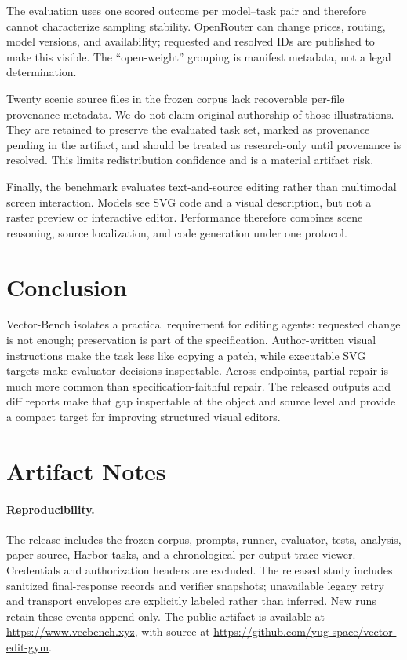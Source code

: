 \documentclass[11pt]{article}
\begin{document}
The evaluation uses one scored outcome per model--task pair and therefore cannot
characterize sampling stability. OpenRouter can change prices, routing, model versions, and
availability; requested and resolved IDs are published to make this visible.
The ``open-weight'' grouping is manifest metadata, not a legal determination.

Twenty scenic source files in the frozen corpus lack recoverable per-file
provenance metadata. We do not claim original authorship of those illustrations.
They are retained to preserve the evaluated task set, marked as provenance
pending in the artifact, and should be treated as research-only until provenance
is resolved. This limits redistribution confidence and is a material artifact
risk.

Finally, the benchmark evaluates text-and-source editing rather than multimodal
screen interaction. Models see SVG code and a visual description, but not a
raster preview or interactive editor. Performance therefore combines scene
reasoning, source localization, and code generation under one protocol.

\section{Conclusion}

Vector-Bench isolates a practical requirement for editing agents: requested
change is not enough; preservation is part of the specification. Author-written
visual instructions make the task less like copying a patch, while executable SVG
targets make evaluator decisions inspectable. Across \ModelCount{} endpoints, partial
repair is much more common than specification-faithful repair. The released
outputs and diff reports make that gap inspectable at the object and source level
and provide a compact target for improving structured visual editors.



\appendix
\clearpage
\onecolumn
\section{Artifact Notes}

\paragraph{Reproducibility.}
The release includes the frozen corpus, prompts, runner, evaluator, tests,
analysis, paper source, Harbor tasks, and a chronological per-output trace viewer.
Credentials and authorization headers are excluded. The released study includes
sanitized final-response records and verifier snapshots; unavailable legacy retry
and transport envelopes are explicitly labeled rather than inferred. New runs
retain these events append-only. The public artifact is available at
\url{https://www.vecbench.xyz}, with source at
\url{https://github.com/yug-space/vector-edit-gym}.
\end{document}
